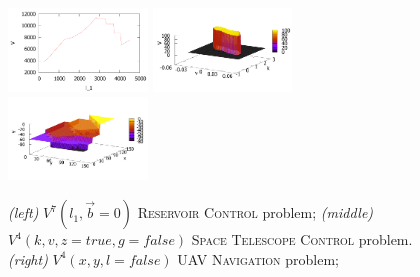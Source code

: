 ﻿%
\begin{figure}[tbp!]
\centering
\includegraphics[width=0.33\textwidth]{Figures/reserV7.pdf}
\includegraphics[width=0.33\textwidth]{Figures/telesV4.pdf}
\includegraphics[width=0.33\textwidth]{Figures/uavV4.pdf}
\vspace{-6mm}
\caption{\footnotesize
{\it (left)}  $V^7(l_1,\vec{b}=0)$ \textsc{Reservoir Control} problem;
{\it (middle)} $V^4(k,v,z=true,g=false)$ \textsc{Space Telescope Control} problem.
{\it (right)}  $V^4(x,y,l=false)$ \textsc{UAV Navigation} problem;
}
\label{fig:Value}
\end{figure}


